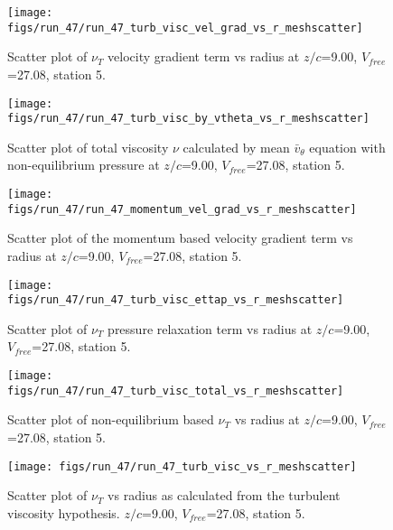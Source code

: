 \begin{figure}[H]
\centering
\texttt{[image: figs/run\_47/run\_47\_turb\_visc\_vel\_grad\_vs\_r\_meshscatter]}
\caption{Scatter plot of $\nu_T$ velocity gradient term vs radius at $z/c$=9.00, $V_{free}$=27.08, station 5.}
\end{figure}


\begin{figure}[H]
\centering
\texttt{[image: figs/run\_47/run\_47\_turb\_visc\_by\_vtheta\_vs\_r\_meshscatter]}
\caption{Scatter plot of total viscosity $\nu$ calculated by mean $\bar{v}_{\theta}$ equation with non-equilibrium pressure at $z/c$=9.00, $V_{free}$=27.08, station 5.}
\end{figure}


\begin{figure}[H]
\centering
\texttt{[image: figs/run\_47/run\_47\_momentum\_vel\_grad\_vs\_r\_meshscatter]}
\caption{Scatter plot of the momentum based velocity gradient term vs radius at $z/c$=9.00, $V_{free}$=27.08, station 5.}
\end{figure}


\begin{figure}[H]
\centering
\texttt{[image: figs/run\_47/run\_47\_turb\_visc\_ettap\_vs\_r\_meshscatter]}
\caption{Scatter plot of $\nu_T$ pressure relaxation term vs radius at $z/c$=9.00, $V_{free}$=27.08, station 5.}
\end{figure}


\begin{figure}[H]
\centering
\texttt{[image: figs/run\_47/run\_47\_turb\_visc\_total\_vs\_r\_meshscatter]}
\caption{Scatter plot of non-equilibrium based $\nu_T$ vs radius at $z/c$=9.00, $V_{free}$=27.08, station 5.}
\end{figure}


\begin{figure}[H]
\centering
\texttt{[image: figs/run\_47/run\_47\_turb\_visc\_vs\_r\_meshscatter]}
\caption{Scatter plot of $\nu_T$ vs radius as calculated from the turbulent viscosity hypothesis. $z/c$=9.00, $V_{free}$=27.08, station 5.}
\end{figure}


